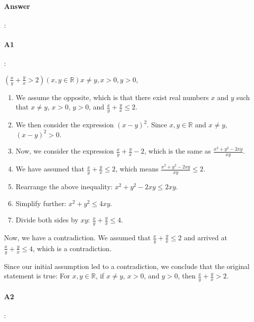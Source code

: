 \documentclass{article}
\begin{document}
\paragraph{Answer}:

\paragraph{A1}:

$(\frac{x}{y} + \frac{y}{x} > 2) (x,y \in \mathbb{R}) x \neq y, x>0, y>0, $
  
\begin{enumerate}
  \item We assume the opposite, which is that there exist real numbers $x$ and $y$ such that $x \neq y$, $x > 0$, $y > 0$, and $\frac{x}{y} + \frac{y}{x} \leq 2$.

  \item We then consider the expression $(x - y)^2$. Since $x,y \in \mathbb{R}$ and $x \neq y$, $(x - y)^2 > 0$.
  
  \item Now, we consider the expression $\frac{x}{y} + \frac{y}{x} - 2$, which is the same as $\frac{x^2 + y^2 - 2xy}{xy}$.
  
  \item We have assumed that $\frac{x}{y} + \frac{y}{x} \leq 2$, which means $\frac{x^2 + y^2 - 2xy}{xy} \leq 2$.
  
  \item Rearrange the above inequality: $x^2 + y^2 - 2xy \leq 2xy$.
  
  \item Simplify further: $x^2 + y^2 \leq 4xy$.
  
  \item Divide both sides by $xy$: $\frac{x}{y} + \frac{y}{x} \leq 4$.
\end{enumerate}


Now, we have a contradiction. We assumed that $\frac{x}{y} + \frac{y}{x} \leq 2$ and arrived at $\frac{x}{y} + \frac{y}{x} \leq 4$, which is a contradiction.

Since our initial assumption led to a contradiction, we conclude that the original statement is true: For $x,y \in \mathbb{R}$, if $x \neq y$, $x > 0$, and $y > 0$, then $\frac{x}{y} + \frac{y}{x} > 2$.

\paragraph{A2}:
\end{document}

